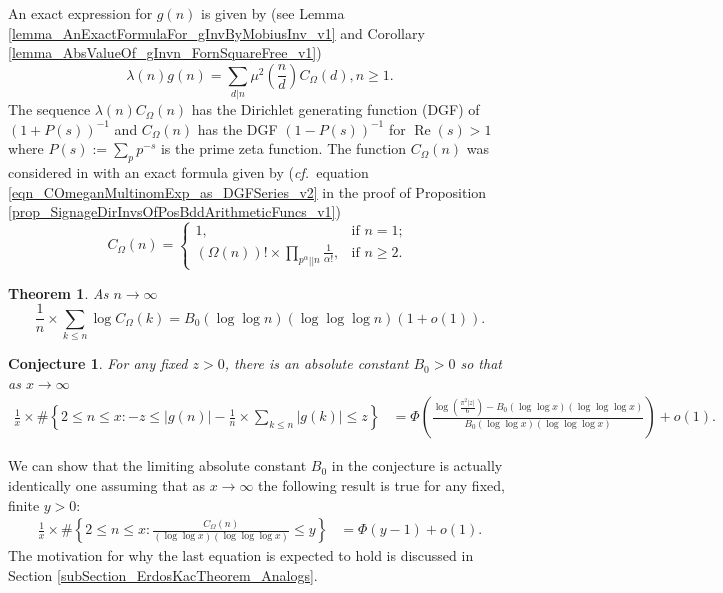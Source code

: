 \documentclass[11pt,reqno,a4letter]{article}
\newcommand{\hlocalref}[1]{\hyperref[#1]{\ref{#1}}}
\numberwithin{equation}{section}
\numberwithin{figure}{section}
\numberwithin{table}{section}
\newcommand{\cf}{\textit{cf.\ }}
\theoremstyle{plain}
\newtheorem{theorem}{Theorem}
\numberwithin{theorem}{section}
\newtheorem*{conjecture*}{Conjecture}
\theoremstyle{definition}
\renewcommand{\Re}{\operatorname{Re}}
\begin{document}
An exact expression for $g(n)$ is given by 
(see Lemma \hlocalref{lemma_AnExactFormulaFor_gInvByMobiusInv_v1} and 
Corollary \hlocalref{lemma_AbsValueOf_gInvn_FornSquareFree_v1}) 
\begin{equation}
\label{eqn_gInvn_ExactDivisorSumFormula_WithSgnWeight_v1} 
\lambda(n) g(n) = \sum_{d|n} \mu^2\left(\frac{n}{d}\right) C_{\Omega}(d), n \geq 1. 
\end{equation}
The sequence $\lambda(n) C_{\Omega}(n)$ has the 
Dirichlet generating function (DGF) of $(1 + P(s))^{-1}$ and 
$C_{\Omega}(n)$ has the DGF $(1-P(s))^{-1}$ for $\Re(s) > 1$ 
where $P(s) := \sum_p p^{-s}$ is the prime zeta function. 
The function $C_{\Omega}(n)$ was considered in 
\cite{FROBERG-1968} with an exact formula given by 
(\cf equation \eqref{eqn_COmeganMultinomExp_as_DGFSeries_v2} in the 
proof of Proposition \hlocalref{prop_SignageDirInvsOfPosBddArithmeticFuncs_v1}) 
\begin{equation}
\label{eqn_proof_tag_hInvn_ExactNestedSumFormula_CombInterpetIdent_v3}
C_{\Omega}(n) = \begin{cases}
     1, & \text{if $n = 1$; } \\ 
     (\Omega(n))! \times \prod\limits_{p^{\alpha}||n} \frac{1}{\alpha!}, & \text{if $n \geq 2$. }
     \end{cases}
\end{equation} 

\begin{theorem} 
\label{lemma_HatCAstxSum_ExactFormulaWithError_v1} 
As $n \rightarrow \infty$ 
\[
\frac{1}{n} \times \sum_{k \leq n} \log C_{\Omega}(k) = 
     B_0 (\log\log n)(\log\log\log n) \left(1 + o(1)\right). 
\] 
\end{theorem} 

\begin{conjecture*}
For any fixed $z > 0$, there is an absolute constant $B_0 > 0$ so that as $x \rightarrow \infty$ 
\begin{align*} 
\frac{1}{x} \times \#\left\{2 \leq n \leq x: -z \leq |g(n)| - 
     \frac{1}{n} \times \sum_{k \leq n} |g(k)| \leq z\right\} & = 
	\Phi\left(\frac{\log\left(\frac{\pi^2 |z|}{6}\right) - B_0 (\log\log x) (\log\log\log x)}{ 
	B_0 (\log\log x)(\log\log\log x)}\right) + o(1).
\end{align*} 
\end{conjecture*}

We can show that the limiting absolute constant $B_0$ in the conjecture is actually 
identically one assuming that as $x \rightarrow \infty$ 
the following result is true for any fixed, finite $y > 0$: 
\begin{align*} 
	\frac{1}{x} \times \#\left\{2 \leq n \leq x: 
	\frac{C_{\Omega}(n)}{ (\log\log x)(\log\log\log x)} \leq y\right\} & = 
	\Phi\left(y - 1\right) + o(1).
\end{align*} 
The motivation for why the last equation is expected to hold is discussed in 
Section \hlocalref{subSection_ErdosKacTheorem_Analogs}. 
\end{document}
